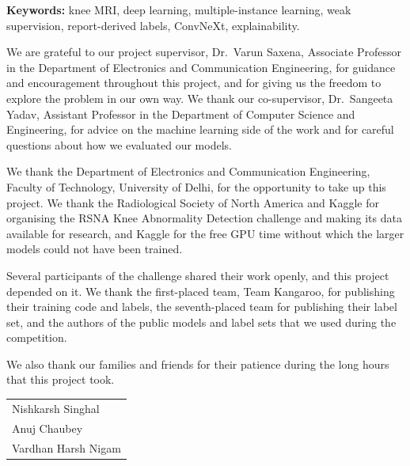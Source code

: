 \vspace{6pt}
\noindent\textbf{Keywords:} knee MRI, deep learning, multiple-instance learning, weak supervision, report-derived labels, ConvNeXt, explainability.

We are grateful to our project supervisor, Dr.\ Varun Saxena, Associate Professor in the Department of Electronics and Communication Engineering, for guidance and encouragement throughout this project, and for giving us the freedom to explore the problem in our own way. We thank our co-supervisor, Dr.\ Sangeeta Yadav, Assistant Professor in the Department of Computer Science and Engineering, for advice on the machine learning side of the work and for careful questions about how we evaluated our models.

We thank the Department of Electronics and Communication Engineering, Faculty of Technology, University of Delhi, for the opportunity to take up this project. We thank the Radiological Society of North America and Kaggle for organising the RSNA Knee Abnormality Detection challenge and making its data available for research, and Kaggle for the free GPU time without which the larger models could not have been trained.

Several participants of the challenge shared their work openly, and this project depended on it. We thank the first-placed team, Team Kangaroo, for publishing their training code and labels, the seventh-placed team for publishing their label set, and the authors of the public models and label sets that we used during the competition.

We also thank our families and friends for their patience during the long hours that this project took.

\vspace{1cm}
\noindent\begin{tabular}{@{}l@{}}
Nishkarsh Singhal\\ Anuj Chaubey\\ Vardhan Harsh Nigam
\end{tabular}

\cleardoublepage
{}
{}
{\singlespacing\listoffigures}

\cleardoublepage
{}
{}
{\singlespacing\listoftables}

